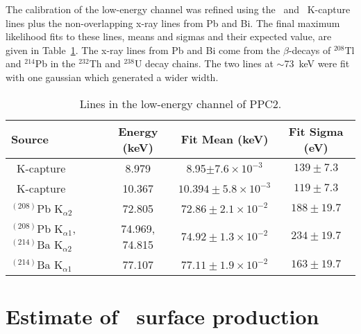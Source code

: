 	The calibration of the low-energy channel was refined using the \gersixeight~and \znsixfive~K-capture lines plus the non-overlapping x-ray lines from Pb and Bi.  The final maximum likelihood fits to these lines, means and sigmas and their expected value, are given in Table~\ref{tab:PPCLowEnergyLines}.  The x-ray lines from Pb and Bi come from the $\beta$-decays of $^{208}$Tl and $^{214}$Pb in the $^{232}$Th and $^{238}$U decay chains.  The two lines at $\sim$73~keV were fit with one gaussian which generated a wider width.  
				\begin{table}
					\begin{tabular}{l|c|c|c}
						Source & Energy (keV) & Fit Mean (keV) & Fit Sigma (eV) \\
						\hline						
						\znsixfive~K-capture & 8.979 & 8.95$\pm7.6\times10^{-3}$ & $139 \pm 7.3$ \\
						\hline
						\gersixeight~K-capture & 10.367 & $10.394\pm5.8\times10^{-3}$ & $119 \pm 7.3$ \\
						\hline
						$^{(208)}$Pb K$_{\alpha2}$ & 72.805 & $72.86\pm2.1\times10^{-2}$ & $188 \pm 19.7$ \\
						\hline
						$^{(208)}$Pb K$_{\alpha1}$, $^{(214)}$Ba K$_{\alpha2}$ & 74.969, 74.815 & $74.92\pm1.3\times10^{-2}$ & $234 \pm 19.7$ \\
						\hline
						$^{(214)}$Ba K$_{\alpha1}$ & 77.107& $77.11\pm1.9\times10^{-2}$ & $163 \pm 19.7$ \\				
						\hline																
					\end{tabular}
					\caption[Lines in the low-energy channel of PPC2]
					{Lines in the low-energy channel of PPC2.}
					\label{tab:PPCLowEnergyLines}
				\end{table}

	\section{Estimate of \gersixeight~surface production}       
	\label{sec:Ge68ProdPPC}
	

